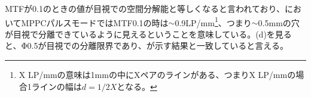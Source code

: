 MTFが0.1のときの値が目視での空間分解能と等しくなると言われており、においてMPPCパルスモードではMTF0.1の時は$\sim$0.9LP/mm\footnote{X LP/mmの意味は1mmの中にXペアのラインがある、つまりX LP/mmの場合1ラインの幅は$d=1/2X$となる。}、つまり$\sim$0.5mmの穴が目視で分離できているように見えるということを意味している。(d)を見ると、Φ0.5が目視での分離限界であり、が示す結果と一致していると言える。
       
